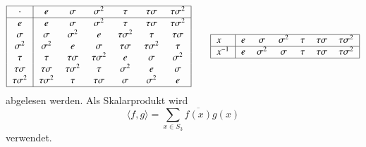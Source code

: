 \[
\begin{tabular}{|>{$}c<{$}|>{$}c<{$}>{$}c<{$}>{$}c<{$}>{$}c<{$}>{$}c<{$}>{$}c<{$}|}
\hline
\cdot        &e            &\sigma      &\sigma^2    &\tau        &\tau\sigma  &\tau\sigma^2\\
\hline
e            &e            &\sigma      &\sigma^2    &\tau        &\tau\sigma  &\tau\sigma^2\\
\sigma       &\sigma       &\sigma^2    &e           &\tau\sigma^2&\tau        &\tau\sigma  \\
\sigma^2     &\sigma^2     &e           &\sigma      &\tau\sigma  &\tau\sigma^2&\tau        \\
\tau         &\tau         &\tau\sigma  &\tau\sigma^2&e           &\sigma      &\sigma^2    \\
\tau\sigma   &\tau\sigma   &\tau\sigma^2&\tau        &\sigma^2    &e           &\sigma       \\
\tau\sigma^2 &\tau\sigma^2 &\tau        &\tau\sigma  &\sigma      &\sigma^2    &e            \\
\hline
\end{tabular}
\qquad
\begin{tabular}{|>{$}l<{$}|>{$}c<{$}>{$}c<{$}>{$}c<{$}>{$}c<{$}>{$}c<{$}>{$}c<{$}|}
\hline
x     & e & \sigma   & \sigma^2 & \tau & \tau\sigma & \tau\sigma^2 \\
\hline
x^{-1}& e & \sigma^2 & \sigma   & \tau & \tau\sigma & \tau\sigma^2 \\
\hline
\end{tabular}
\]
abgelesen werden.
Als Skalarprodukt wird 
\[
\langle f,g\rangle
=
\sum_{x\in S_3} \overline{f(x)}g(x)
\]
verwendet.
